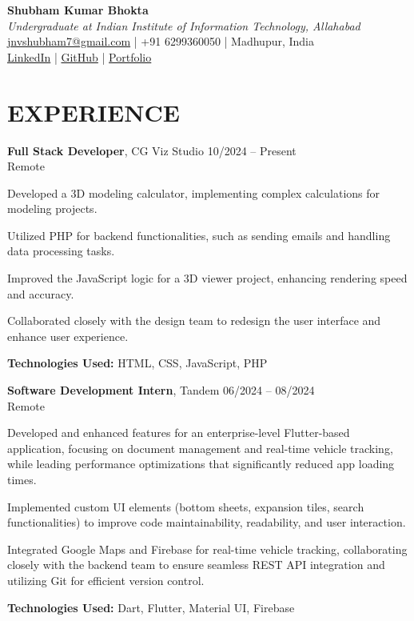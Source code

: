 \documentclass[10pt, letterpaper]{article}
\begin{document}
\begin{center}
    \textbf{\huge Shubham Kumar Bhokta} \\[0.5em]
    \textit{Undergraduate at Indian Institute of Information Technology, Allahabad} \\[0.5em]
    \href{mailto:jnvshubham7@gmail.com}{jnvshubham7@gmail.com} | 
    +91 6299360050 | 
    Madhupur, India \\
    \href{https://linkedin.com/in/shubham-kumar-bhokta-97113116b}{LinkedIn} | 
    \href{https://github.com/jnvshubham7}{GitHub} | 
    \href{https://shubhambhokta.vercel.app/}{Portfolio}
\end{center}

\section{EXPERIENCE}

\textbf{Full Stack Developer}, CG Viz Studio \hfill 10/2024 -- Present \\
Remote
\begin{highlightsforbulletentries}
    \item Developed a 3D modeling calculator, implementing complex calculations for modeling projects.
    \item Utilized PHP for backend functionalities, such as sending emails and handling data processing tasks.
    \item Improved the JavaScript logic for a 3D viewer project, enhancing rendering speed and accuracy.
    \item Collaborated closely with the design team to redesign the user interface and enhance user experience.
\end{highlightsforbulletentries}
\textbf{Technologies Used:} HTML, CSS, JavaScript, PHP

\vspace{1em}

\textbf{Software Development Intern}, Tandem \hfill 06/2024 -- 08/2024 \\
Remote
\begin{highlightsforbulletentries}
    \item Developed and enhanced features for an enterprise-level Flutter-based application, focusing on document management and real-time vehicle tracking, while leading performance optimizations that significantly reduced app loading times.
    \item Implemented custom UI elements (bottom sheets, expansion tiles, search functionalities) to improve code maintainability, readability, and user interaction.
    \item Integrated Google Maps and Firebase for real-time vehicle tracking, collaborating closely with the backend team to ensure seamless REST API integration and utilizing Git for efficient version control.
\end{highlightsforbulletentries}
\textbf{Technologies Used:} Dart, Flutter, Material UI, Firebase
\end{document}
